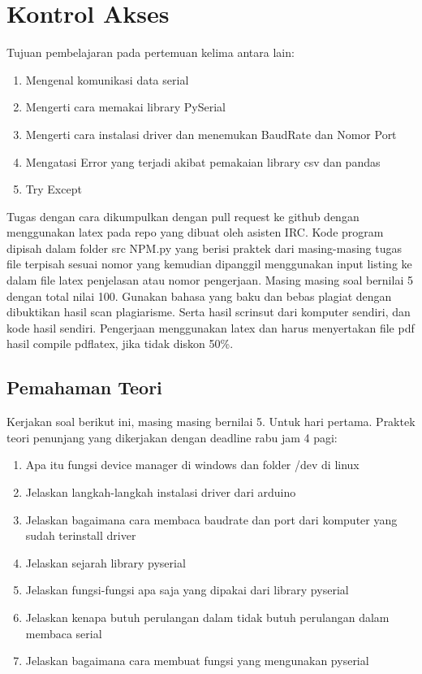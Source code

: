 \chapter{Kontrol Akses}

Tujuan pembelajaran pada pertemuan kelima antara lain:
\begin{enumerate}
\item
Mengenal komunikasi data serial
\item
Mengerti cara memakai library PySerial
\item
Mengerti cara instalasi driver dan menemukan BaudRate dan Nomor Port
\item
Mengatasi Error yang terjadi akibat pemakaian library csv dan pandas
\item
Try Except
\end{enumerate}
Tugas dengan cara dikumpulkan dengan pull request ke github dengan menggunakan latex pada repo yang dibuat oleh asisten IRC. Kode program dipisah dalam folder src NPM.py yang berisi praktek dari masing-masing tugas file terpisah sesuai nomor yang kemudian dipanggil menggunakan input listing ke dalam file latex penjelasan atau nomor pengerjaan. Masing masing soal bernilai 5 dengan total nilai 100. Gunakan bahasa yang baku dan bebas plagiat dengan dibuktikan hasil scan plagiarisme. Serta hasil scrinsut dari komputer sendiri, dan kode hasil sendiri. Pengerjaan menggunakan latex dan harus menyertakan file pdf hasil compile pdflatex, jika tidak diskon 50\%.


\section{Pemahaman Teori}
Kerjakan soal berikut ini, masing masing bernilai 5. Untuk hari pertama.
Praktek teori penunjang yang dikerjakan dengan deadline rabu jam 4 pagi:
\begin{enumerate}
\item
Apa itu fungsi device manager di windows dan folder /dev di linux
\item
Jelaskan langkah-langkah instalasi driver dari arduino
\item
Jelaskan bagaimana cara membaca baudrate dan port dari komputer yang sudah terinstall driver
\item
Jelaskan sejarah library pyserial
\item
Jelaskan fungsi-fungsi apa saja yang dipakai dari library pyserial
\item
Jelaskan kenapa butuh perulangan dalam tidak butuh perulangan dalam membaca serial
\item
Jelaskan bagaimana cara membuat fungsi yang mengunakan pyserial
\end{enumerate}

